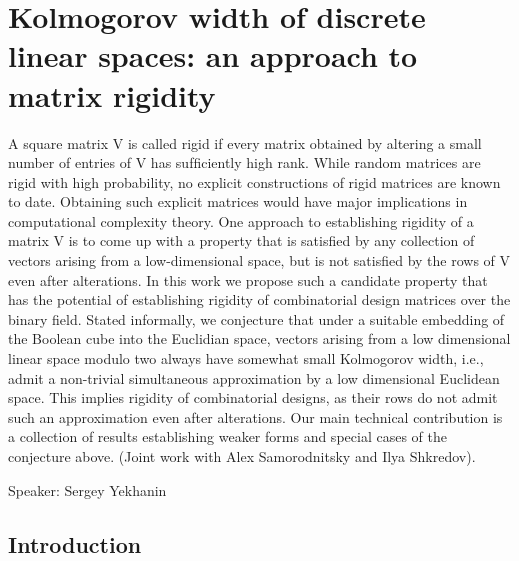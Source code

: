 




\section{Kolmogorov width of discrete linear spaces: an approach to matrix rigidity}
A square matrix V is called rigid if every matrix obtained by altering a small number of entries of V has sufﬁciently high rank. While random matrices are rigid with high probability, no explicit constructions of rigid matrices are known to date. Obtaining such explicit matrices would have major implications in computational complexity theory. One approach to establishing rigidity of a matrix V is to come up with a property that is satisﬁed by any collection of vectors arising from a low-dimensional space, but is not satisﬁed by the rows of V even after alterations. In this work we propose such a candidate property that has the potential of establishing rigidity of combinatorial design matrices over the binary ﬁeld. Stated informally, we conjecture that under a suitable embedding of the Boolean cube into the Euclidian space, vectors arising from a low dimensional linear space modulo two always have somewhat small Kolmogorov width, i.e., admit a non-trivial simultaneous approximation by a low dimensional Euclidean space. This implies rigidity of combinatorial designs, as their rows do not admit such an approximation even after alterations. Our main technical contribution is a collection of results establishing weaker forms and special cases of the conjecture above. (Joint work with Alex Samorodnitsky and Ilya Shkredov).

Speaker: Sergey Yekhanin

\subsection{Introduction}

